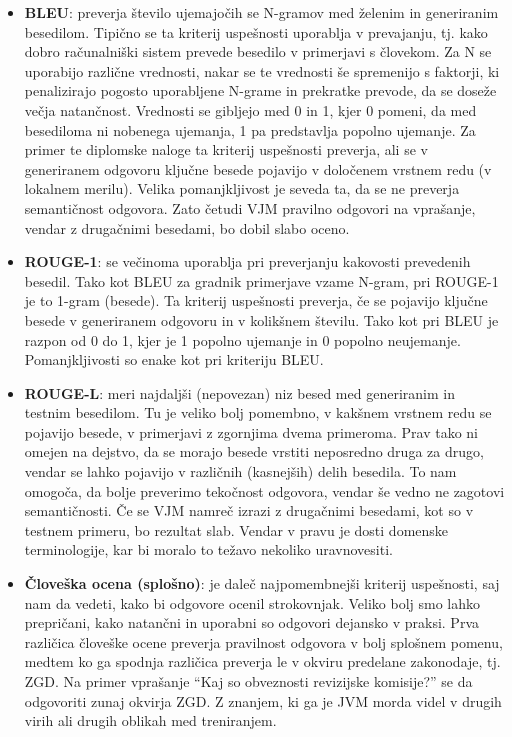 \documentclass[a4paper,12pt,openright]{book}
\begin{document}
\begin{itemize}
	\item \textbf{BLEU}: preverja število ujemajočih se N-gramov med želenim in generiranim besedilom. Tipično se ta kriterij uspešnosti uporablja v prevajanju, tj. kako dobro računalniški sistem prevede besedilo v primerjavi s človekom. Za N se uporabijo različne vrednosti, nakar se te vrednosti še spremenijo s faktorji, ki penalizirajo pogosto uporabljene N-grame in prekratke prevode, da se doseže večja natančnost. Vrednosti se gibljejo med 0 in 1, kjer 0 pomeni, da med besediloma ni nobenega ujemanja, 1 pa predstavlja popolno ujemanje. Za primer te diplomske naloge ta kriterij uspešnosti preverja, ali se v generiranem odgovoru ključne besede pojavijo v določenem vrstnem redu (v lokalnem merilu). Velika pomanjkljivost je seveda ta, da se ne preverja semantičnost odgovora. Zato četudi VJM pravilno odgovori na vprašanje, vendar z drugačnimi besedami, bo dobil slabo oceno.
	\item \textbf{ROUGE-1}: se večinoma uporablja pri preverjanju kakovosti prevedenih besedil. Tako kot BLEU za gradnik primerjave vzame N-gram, pri ROUGE-1 je to 1-gram (besede). Ta kriterij uspešnosti preverja, če se pojavijo ključne besede v generiranem odgovoru in v kolikšnem številu. Tako kot pri BLEU je razpon od 0 do 1, kjer je 1 popolno ujemanje in 0 popolno neujemanje. Pomanjkljivosti so enake kot pri kriteriju BLEU.
	\item \textbf{ROUGE-L}: meri najdaljši (nepovezan) niz besed med generiranim in testnim besedilom. Tu je veliko bolj pomembno, v kakšnem vrstnem redu se pojavijo besede, v primerjavi z zgornjima dvema primeroma. Prav tako ni omejen na dejstvo, da se morajo besede vrstiti neposredno druga za drugo, vendar se lahko pojavijo v različnih (kasnejših) delih besedila. To nam omogoča, da bolje preverimo tekočnost odgovora, vendar še vedno ne zagotovi semantičnosti. Če se VJM namreč izrazi z drugačnimi besedami, kot so v testnem primeru, bo rezultat slab. Vendar v pravu je dosti domenske terminologije, kar bi moralo to težavo nekoliko uravnovesiti.
	\item \textbf{Človeška ocena (splošno)}: je daleč najpomembnejši kriterij uspešnosti, saj nam da vedeti, kako bi odgovore ocenil strokovnjak. Veliko bolj smo lahko prepričani, kako natančni in uporabni so odgovori dejansko v praksi. Prva različica človeške ocene preverja pravilnost odgovora v bolj splošnem pomenu, medtem ko ga spodnja različica preverja le v okviru predelane zakonodaje, tj. ZGD. Na primer vprašanje “Kaj so obveznosti revizijske komisije?” se da odgovoriti zunaj okvirja ZGD. Z znanjem, ki ga je JVM morda videl v drugih virih ali drugih oblikah med treniranjem.

\end{itemize}
\end{document}
